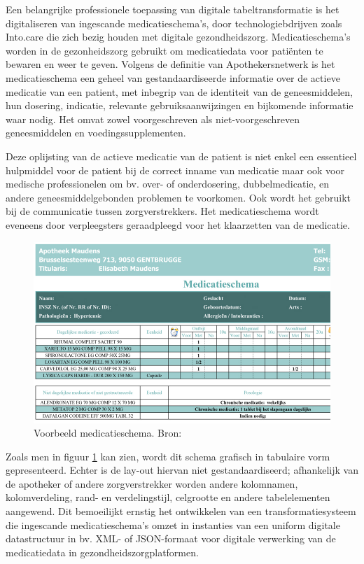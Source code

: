 Een belangrijke professionele toepassing van digitale tabeltransformatie is het digitaliseren van ingescande medicatieschema’s, door technologiebdrijven zoals Into.care die zich bezig houden met digitale gezondheidszorg. Medicatieschema's worden in de gezonheidszorg gebruikt om medicatiedata voor patiënten te bewaren en weer te geven. Volgens de definitie van Apothekersnetwerk \autocite{ApothekersNetwerk2013} is het medicatieschema een geheel van gestandaardiseerde informatie over de actieve medicatie van een patient, met inbegrip van de identiteit van de geneesmiddelen, hun dosering, indicatie, relevante gebruiksaanwijzingen en bijkomende informatie waar nodig. Het omvat zowel voorgeschreven als niet-voorgeschreven geneesmiddelen en voedingssupplementen.

Deze oplijsting van de actieve medicatie van de patient is niet enkel een essentieel hulpmiddel voor de patient bij de correct inname van medicatie maar ook voor medische professionelen om bv. over- of onderdosering, dubbelmedicatie, en andere geneesmiddelgebonden problemen te voorkomen. Ook wordt het gebruikt bij de communicatie tussen zorgverstrekkers. Het medicatieschema wordt eveneens door verpleegsters geraadpleegd voor het klaarzetten van de medicatie.

\begin{figure}[H]
    \centering
    \includegraphics[width=1\textwidth]{img/voorbeeld_medicatieschema.jpg}
    \caption{Voorbeeld medicatieschema. Bron: \textcite{Tsjoen2020}}
    \label{fig:voorbeeld_medicatieschema}
\end{figure}

Zoals men in figuur \ref{fig:voorbeeld_medicatieschema} kan zien, wordt dit schema grafisch in tabulaire vorm gepresenteerd. Echter is de lay-out hiervan niet gestandaardiseerd; afhankelijk van de apotheker of andere zorgverstrekker worden andere kolomnamen, kolomverdeling, rand- en verdelingstijl, celgrootte en andere tabelelementen aangewend. Dit bemoeilijkt ernstig het ontwikkelen van een transformatiesysteem die ingescande medicatieschema’s omzet in instanties van een uniform digitale datastructuur in bv. XML- of JSON-formaat voor digitale verwerking van de medicatiedata in gezondheidszorgplatformen.

